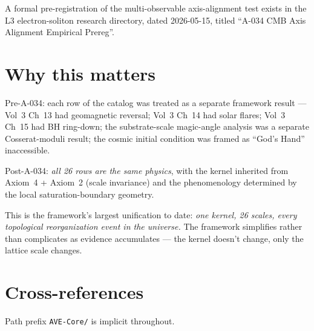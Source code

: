 A formal pre-registration of the multi-observable axis-alignment test
exists in the L3 electron-soliton research directory, dated 2026-05-15,
titled ``A-034 CMB Axis Alignment Empirical Prereg''.

\section{Why this matters}

Pre-A-034: each row of the catalog was treated as a separate framework
result --- Vol~3 Ch~13 had geomagnetic reversal; Vol~3 Ch~14 had solar
flares; Vol~3 Ch~15 had BH ring-down; the substrate-scale magic-angle
analysis was a separate Cosserat-moduli result; the cosmic initial
condition was framed as ``God's Hand'' inaccessible.

Post-A-034: \emph{all 26 rows are the same physics}, with the kernel
inherited from Axiom~4 + Axiom~2 (scale invariance) and the
phenomenology determined by the local saturation-boundary geometry.

This is the framework's largest unification to date: \emph{one kernel,
26 scales, every topological reorganization event in the universe.}
The framework simplifies rather than complicates as evidence
accumulates --- the kernel doesn't change, only the lattice scale
changes.

\section{Cross-references}

Path prefix \texttt{AVE-Core/} is implicit throughout.

